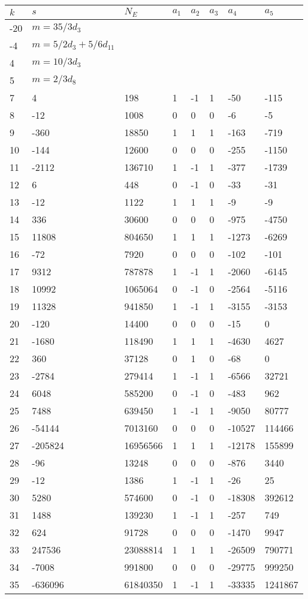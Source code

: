 \documentclass{amsart}
\begin{document}
\begin{longtable}{|l|l|l|lllll|}
\hline
$k$ & $s$ & $N_E$ & $a_1$ & $a_2$ & $a_3$ & $a_4$ & $a_5$\\
\hline
-20&$m=35/3d_{3}$&&\multicolumn{5}{c|}{}\\
-4&$m=5/2d_{3}+5/6d_{11}$&&\multicolumn{5}{c|}{}\\
4&$m=10/3d_{3}$&&\multicolumn{5}{c|}{}\\
5&$m=2/3d_{8}$&&\multicolumn{5}{c|}{}\\
7&4&198&1&-1&1&-50&-115\\
8&-12&1008&0&0&0&-6&-5\\
9&-360&18850&1&1&1&-163&-719\\
10&-144&12600&0&0&0&-255&-1150\\
11&-2112&136710&1&-1&1&-377&-1739\\
12&6&448&0&-1&0&-33&-31\\
13&-12&1122&1&1&1&-9&-9\\
14&336&30600&0&0&0&-975&-4750\\
15&11808&804650&1&1&1&-1273&-6269\\
16&-72&7920&0&0&0&-102&-101\\
17&9312&787878&1&-1&1&-2060&-6145\\
18&10992&1065064&0&-1&0&-2564&-5116\\
19&11328&941850&1&-1&1&-3155&-3153\\
20&-120&14400&0&0&0&-15&0\\
21&-1680&118490&1&1&1&-4630&4627\\
22&360&37128&0&1&0&-68&0\\
23&-2784&279414&1&-1&1&-6566&32721\\
24&6048&585200&0&-1&0&-483&962\\
25&7488&639450&1&-1&1&-9050&80777\\
26&-54144&7013160&0&0&0&-10527&114466\\
27&-205824&16956566&1&1&1&-12178&155899\\
28&-96&13248&0&0&0&-876&3440\\
29&-12&1386&1&-1&1&-26&25\\
30&5280&574600&0&-1&0&-18308&392612\\
31&1488&139230&1&-1&1&-257&749\\
32&624&91728&0&0&0&-1470&9947\\
33&247536&23088814&1&1&1&-26509&790771\\
34&-7008&991800&0&0&0&-29775&999250\\
35&-636096&61840350&1&-1&1&-33335&1241867\\

\end{longtable}
\end{document}
